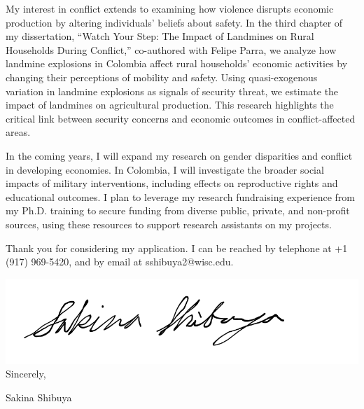\documentclass[12pt]{letter}
\begin{document}
My interest in conflict extends to examining how violence disrupts economic production by altering individuals' beliefs about safety. 
In the third chapter of my dissertation, ``Watch Your Step: The Impact of Landmines on Rural Households During Conflict,'' co-authored with Felipe Parra, 
we analyze how landmine explosions in Colombia affect rural households' economic activities by changing their perceptions of mobility and safety. 
Using quasi-exogenous variation in landmine explosions as signals of security threat, we estimate the impact of landmines on agricultural production. 
This research highlights the critical link between security concerns and economic outcomes in conflict-affected areas.


In the coming years, I will expand my research on gender disparities and conflict in developing economies. 
In Colombia, I will investigate the broader social impacts of military interventions, including effects on reproductive rights and educational outcomes. 
I plan to leverage my research fundraising experience from my Ph.D. training to secure funding from diverse public, private, and non-profit sources, 
using these resources to support research assistants on my projects.

Thank you for considering my application. 
I can be reached by telephone at +1 (917) 969-5420, and by email at sshibuya2@wisc.edu.

\bigskip

\includegraphics[height=4\baselineskip]{signature.png}  \\

\vspace*{-6.5\baselineskip}Sincerely, 

\vspace{2.5\baselineskip}Sakina Shibuya
\end{document}
